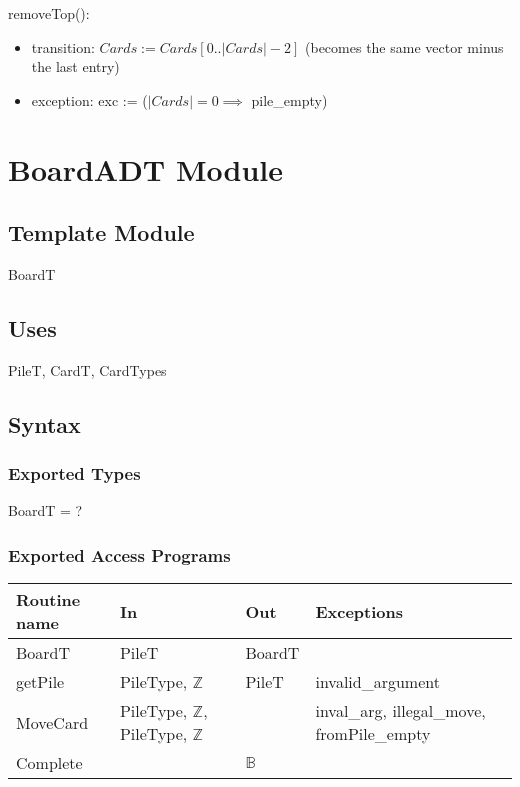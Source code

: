 \documentclass[12pt]{article}
\begin{document}
\noindent removeTop():
\begin{itemize}
\item transition: $Cards := Cards[0..|Cards|-2]$ (becomes the same vector minus the last entry)
\item exception: exc := ($|Cards| = 0 \implies$ pile\_empty)
\end{itemize}



\newpage

\section* {BoardADT Module}

\subsection*{Template Module}

BoardT

\subsection* {Uses}

PileT, CardT, CardTypes

\subsection* {Syntax}

\subsubsection* {Exported Types}

BoardT = ?

\subsubsection* {Exported Access Programs}

\begin{tabular}{| l | l | l | l |}
\hline
\textbf{Routine name} & \textbf{In} & \textbf{Out} & \textbf{Exceptions}\\
\hline
BoardT & PileT & BoardT & \\
\hline
getPile & PileType, $\mathbb{Z}$ & PileT & invalid\_argument\\ 
\hline
MoveCard & PileType, $\mathbb{Z}$, PileType, $\mathbb{Z}$ & ~ & inval\_arg, illegal\_move, fromPile\_empty\\
\hline
Complete & ~ & $\mathbb{B}$ & ~\\
\hline
\end{tabular}
\end{document}
